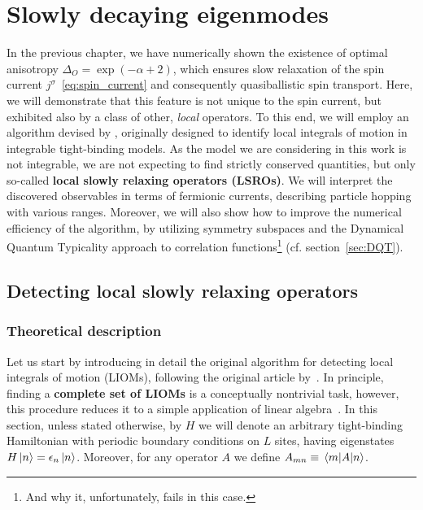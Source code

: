 \chapter{Slowly decaying eigenmodes\label{chap:currents}}
\thispagestyle{chapterBeginStyle}

In the previous chapter, we have numerically shown the existence of optimal anisotropy
\(\Delta_{O} = \exp(- \alpha + 2)\), which ensures slow relaxation of the spin current
\(j^{\sigma}\)~\eqref{eq:spin_current} and consequently quasiballistic spin transport.
Here, we will demonstrate that this feature is not unique to the spin current, but
exhibited also by a class of other, \textit{local} operators. To this end, we will
employ an algorithm devised by \textcite{Mierzejewski2015a}, originally designed to
identify local integrals of motion in integrable tight-binding models. As the model
we are considering in this work is not integrable, we are not expecting to find
strictly conserved quantities, but only so-called \textbf{local slowly relaxing
  operators (LSROs)}. We will interpret the discovered observables in terms of
fermionic currents, describing particle hopping with various ranges.
Moreover, we will also show how to improve the numerical efficiency of
the algorithm, by utilizing symmetry subspaces and the Dynamical Quantum Typicality
approach to correlation functions\footnote{And why it, unfortunately, fails in this case.}
(cf. section~\ref{sec:DQT}).


\section{Detecting local slowly relaxing operators \label{sec:slowly_relaxing_operators}}
\subsection{Theoretical description}
Let us start by introducing in detail the original algorithm for detecting local integrals
of motion (LIOMs), following the original article by~\autocite{Mierzejewski2015a}.
In principle, finding a \textbf{complete set of LIOMs} is a conceptually
nontrivial task, however, this procedure reduces it to a simple application of linear algebra~\autocite{Mierzejewski2015a}.
In this section, unless stated otherwise, by \(H\) we will denote an arbitrary
tight-binding Hamiltonian with periodic boundary conditions
on \(L\) sites, having eigenstates \(H \ket{n} = \epsilon_{n} \ket{n}\). Moreover,
for any operator \(A\) we define \(A_{mn} \equiv \matrixel{m}{A}{n}\).

